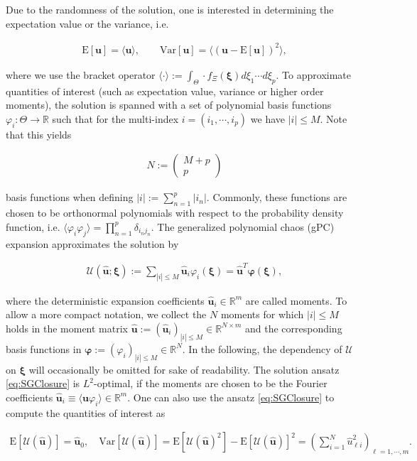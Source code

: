 Due to the randomness of the solution, one is interested in determining the expectation value or the variance, i.e.
\begin{linenomath*}\begin{align*}
\text{E}[\bm{u}] = \langle \bm{u} \rangle,\qquad \text{Var}[\bm{u}] = \langle \left( \bm{u}-\text{E}[\bm{u}]\right)^2\rangle,
\end{align*}\end{linenomath*}
where we use the bracket operator $\langle \cdot \rangle := \int_{\Theta} \cdot f_{\Xi}(\bm\xi)d\xi_1 \cdots d\xi_p$. To approximate quantities of interest (such as expectation value, variance or higher order moments), the solution is spanned with a set of polynomial basis functions $\varphi_{i}:\Theta\to\mathbb{R}$ such that for the multi-index $i = (i_1,\cdots,i_p)$ we have $|i| \leq M$. Note that this yields
\begin{linenomath*}\begin{align}\label{eq:numberBasisFcts}
N:=\begin{pmatrix}
M+p \\ p
\end{pmatrix}
\end{align}\end{linenomath*}
basis functions when defining $|i|:=\sum_{n = 1}^p |i_n|$. Commonly, these functions are chosen to be orthonormal polynomials \cite{wiener1938homogeneous} with respect to the probability density function, i.e. $\langle \varphi_i \varphi_j \rangle =\prod_{n=1}^p\delta_{i_nj_n}$. The generalized polynomial chaos (gPC) expansion \cite{xiu2002wiener} approximates the solution by
\begin{linenomath*}\begin{align}\label{eq:SGClosure}
\mathcal{U}(\bm{\hat u};\bm\xi):= \sum_{|i|\leq M} \bm{\hat{u}}_i\varphi_i(\bm{\xi}) = \bm{\hat{u}}^T\bm{\varphi}(\bm\xi),
\end{align}\end{linenomath*}
where the deterministic expansion coefficients $\bm{\hat{u}}_i\in\mathbb{R}^m$ are called moments. To allow a more compact notation, we collect the $N$ moments for which $\vert i \vert \leq M$ holds in the moment matrix $\bm{\hat{u}}:=(\bm{\hat{u}}_i)_{|i|\leq M}\in\mathbb{R}^{N\times m}$ and the corresponding basis functions in $\bm{\varphi}:=(\varphi_i)_{|i|\leq M}\in\mathbb{R}^{N}$. In the following, the dependency of $\mathcal{U}$ on $\bm \xi$ will occasionally be omitted for sake of readability. The solution ansatz \eqref{eq:SGClosure} is $L^2$-optimal, if the moments are chosen to be the Fourier coefficients $\bm{\hat u}_i \equiv \langle \bm{u}\varphi_i \rangle\in\mathbb{R}^m$. One can also use the ansatz \eqref{eq:SGClosure} to compute the quantities of interest as
\begin{linenomath*}\begin{align*}
\text{E}[\mathcal{U}(\bm{\hat u})] = \bm{\hat u}_0,\quad \text{Var}[\mathcal{U}(\bm{\hat u})] = \text{E}[\mathcal{U}(\bm{\hat u})^2] - \text{E}[\mathcal{U}(\bm{\hat u})]^2 = \left(\sum_{i = 1}^N \hat{u}_{\ell i}^2\right)_{\ell = 1,\cdots,m}.
\end{align*}\end{linenomath*}

